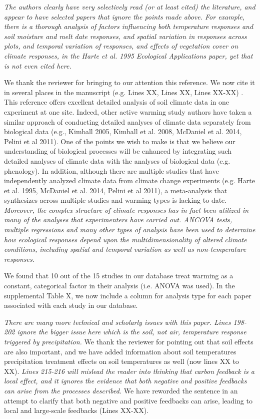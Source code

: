 \documentclass[11pt,a4paper]{letter}
\begin{document}
\emph{The authors clearly have very selectively read (or at least cited) the literature,  and appear to have selected papers that ignore the points made above.  For example, there is a  thorough analysis of factors influencing both temperature responses and soil moisture and melt date responses, and spatial variation in responses across plots,  and temporal variation of responses, and effects of vegetation cover on climate responses, in the Harte et al. 1995 Ecological Applications paper, yet that is not even cited here.}

We thank the reviewer for bringing to our attention this reference. We now cite it in several places in the manuscript (e.g. Lines XX, Lines XX, Lines XX-XX) . This reference offers excellent detailed analysis of soil climate data in one experiment at one site. Indeed, other active warming study authors have taken a similar approach of conducting detailed analyses of climate data separately from biological data (e.g., Kimball 2005, Kimball et al. 2008, McDaniel et al. 2014, Pelini et al 2011). One of the points we wish to make is that we believe our understanding of biological processes will be enhanced by integrating such detailed analyses of climate data with the analyses of biological data (e.g. phenology). In addition, although there are multiple studies that have independently analyzed climate data from climate change experiments (e.g. Harte et al. 1995, McDaniel et al. 2014, Pelini et al 2011), a meta-analysis that synthesizes across multiple studies and warming types is lacking to date.\\

\emph{Moreover, the complex structure of climate responses has in fact been utilized in many of the analyses that experimenters have carried out.  ANCOVA tests, multiple regressions and many other types of analysis have been used to determine how ecological responses depend upon the multidimensionality of altered climate conditions, including spatial and temporal variation as well as non-temperature responses.}

We found that 10 out of the 15 studies in our database treat warming as a constant, categorical factor in their analysis (i.e. ANOVA was used). In the supplemental Table X,   
we now include a column for analysis type for each paper associated with each study in our database. 
\par \emph{There are many more technical and scholarly issues with this paper.  Lines 198-202 ignore the bigger issue here which is the soil, not air, temperature response triggered by precipitation.}
We thank the reviewer for pointing out that soil effects are also important, and we have added information about soil temperatures precipitation treatment effects on soil temperatures as well (now lines XX to XX).
\emph  {Lines 215-216 will mislead the reader into thinking that carbon feedback is a local effect, and it ignores the evidence that both negative and positive feedbacks can arise from the processes described.}  
We have reworded the sentence in an attempt to clarify that both negative and positive feedbacks can arise, leading to local and large-scale feedbacks (Lines XX-XX).
\end{document}
